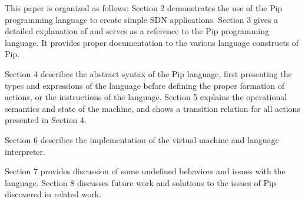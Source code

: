 
This paper is organized as follows: Section 2 demonstrates the use of the Pip programming language to create simple SDN applications. Section 3 gives a detailed explanation of and serves as a reference to the Pip programming language. It provides proper documentation to the various language constructs of Pip.

Section 4 describes the abstract syntax of the Pip language, first presenting the types and expressions of the language before defining the proper formation of actions, or the instructions of the language. Section 5 explains the operational semantics and state of the machine, and shows a transition relation for all actions presented in Section 4.

Section 6 describes the implementation of the virtual machine and language interpreter.

Section 7 provides discussion of some undefined behaviors and issues with the language. Section 8 discusses future work and solutions to the issues of Pip discovered in related work.
